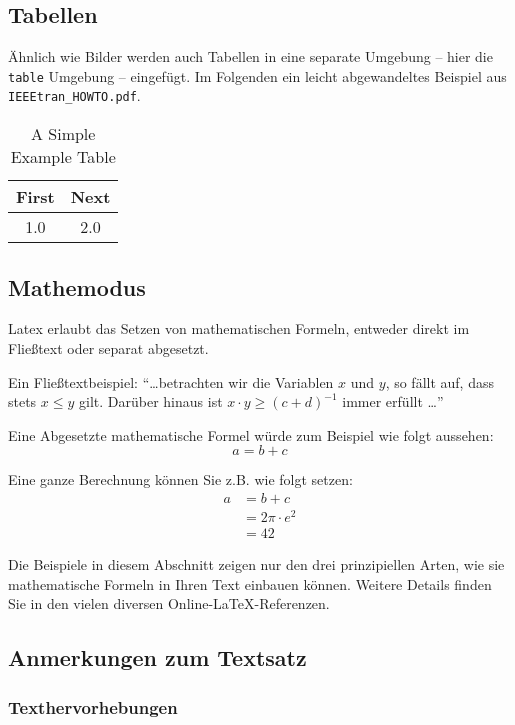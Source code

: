 \documentclass[a4paper,twoside]{IEEEtran}
\begin{document}
\subsection{Tabellen}

Ähnlich wie Bilder werden auch Tabellen in eine separate Umgebung -- hier die \texttt{table} Umgebung --  eingefügt. Im Folgenden ein leicht abgewandeltes Beispiel aus \texttt{IEEEtran\_HOWTO.pdf}.

\begin{table}
\caption{A Simple Example Table}\label{Eine Beispieltabelle}
\centering
\begin{tabular}{c|c}
\hline
\bfseries  First  &  \bfseries  Next\\
\hline\hline
1.0  &  2.0\\
\hline
\end{tabular}
\end{table}


\subsection{Mathemodus}

Latex erlaubt das Setzen von mathematischen Formeln, entweder direkt im Fließtext oder separat abgesetzt.

Ein Fließtextbeispiel: "`\dots betrachten wir die Variablen $x$ und $y$, so fällt auf, dass stets $x \leq y$ gilt. Darüber hinaus ist $x \cdot y \geq (c+d)^{-1}$ immer erfüllt \dots"'

Eine Abgesetzte mathematische Formel würde zum Beispiel wie folgt aussehen:
\[
a = b + c
\]  

Eine ganze Berechnung können Sie z.B. wie folgt setzen:
\begin{align*}
a &= b + c \\
  &= 2 \pi \cdot e^2 \\
  &= 42
\end{align*}

Die Beispiele in diesem Abschnitt zeigen nur den drei prinzipiellen Arten, wie sie mathematische Formeln in Ihren Text einbauen können. Weitere Details finden Sie in den vielen diversen Online-LaTeX-Referenzen.


\subsection{Anmerkungen zum Textsatz}

\subsubsection{Texthervorhebungen}
\end{document}

